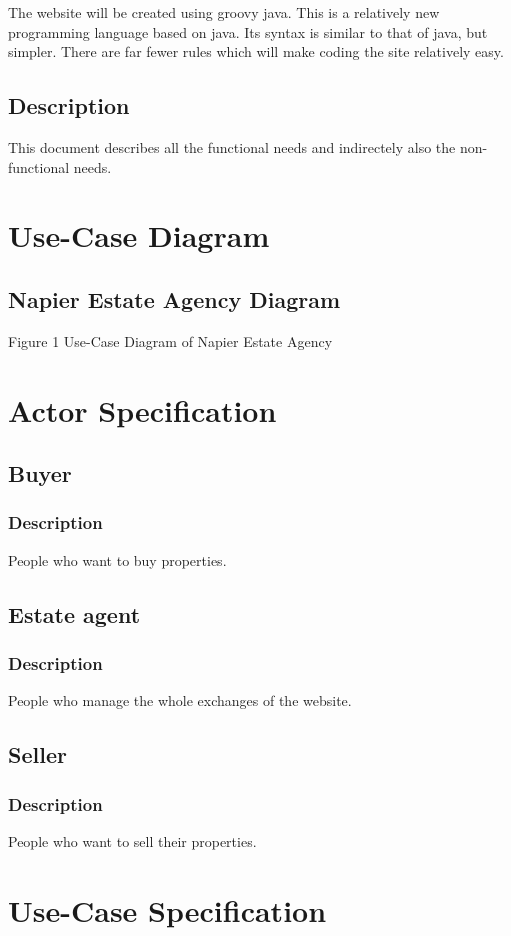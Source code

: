 \documentclass[a4paper,12pt]{article}
\begin{document}
The website will be created using groovy java. This is a relatively new programming language based on java. Its syntax is similar to that of java, but simpler. There are far fewer rules which will make coding the site relatively easy.

\subsection{Description}
This document describes all the functional needs and indirectely also the non-functional needs.
 
\section{Use-Case Diagram}
\subsection{Napier Estate Agency Diagram}
Figure 1 Use-Case Diagram of Napier Estate Agency

 
\section{Actor Specification}
\subsection{Buyer}
\subsubsection{Description}
People who want to buy properties.
\subsection{Estate agent}
\subsubsection{Description}
People who manage the whole exchanges of the website.
\subsection{Seller}
\subsubsection{Description}
People who want to sell their properties.

 
\section{Use-Case Specification}
\end{document}

